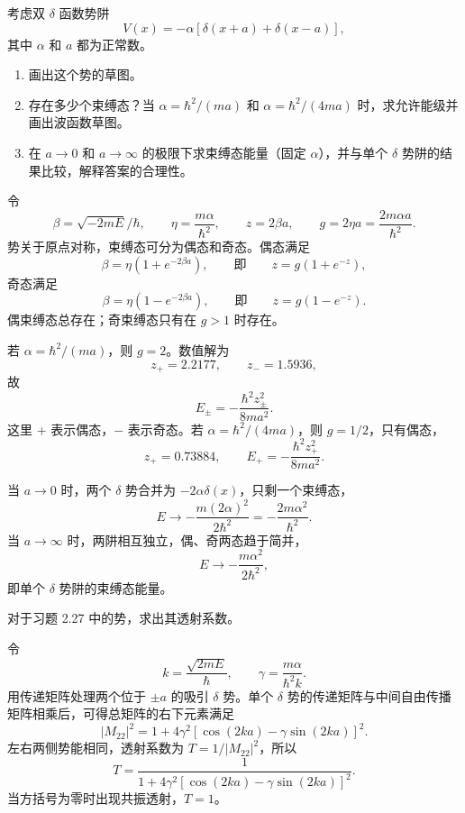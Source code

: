 \begin{question}
考虑双 $\delta$ 函数势阱
\[
V(x)=-\alpha[\delta(x+a)+\delta(x-a)],
\]
其中 $\alpha$ 和 $a$ 都为正常数。
\begin{enumerate}
\item 画出这个势的草图。
\item 存在多少个束缚态？当 $\alpha=\hbar^2/(ma)$ 和 $\alpha=\hbar^2/(4ma)$ 时，求允许能级并画出波函数草图。
\item 在 $a\to0$ 和 $a\to\infty$ 的极限下求束缚态能量（固定 $\alpha$），并与单个 $\delta$ 势阱的结果比较，解释答案的合理性。
\end{enumerate}
\end{question}
\begin{solution}
令
\[
\beta=\sqrt{-2mE}/\hbar,
\qquad
\eta=\frac{m\alpha}{\hbar^2},
\qquad
z=2\beta a,
\qquad
g=2\eta a=\frac{2m\alpha a}{\hbar^2}.
\]
势关于原点对称，束缚态可分为偶态和奇态。偶态满足
\[
\beta=\eta\left(1+e^{-2\beta a}\right),
\qquad\text{即}\qquad z=g(1+e^{-z}),
\]
奇态满足
\[
\beta=\eta\left(1-e^{-2\beta a}\right),
\qquad\text{即}\qquad z=g(1-e^{-z}).
\]
偶束缚态总存在；奇束缚态只有在 $g>1$ 时存在。

若 $\alpha=\hbar^2/(ma)$，则 $g=2$。数值解为
\[
z_+=2.2177,
\qquad z_-=1.5936,
\]
故
\[
E_\pm=-\frac{\hbar^2z_\pm^2}{8ma^2}.
\]
这里 $+$ 表示偶态，$-$ 表示奇态。若 $\alpha=\hbar^2/(4ma)$，则 $g=1/2$，只有偶态，
\[
z_+=0.73884,
\qquad
E_+=-\frac{\hbar^2z_+^2}{8ma^2}.
\]

当 $a\to0$ 时，两个 $\delta$ 势合并为 $-2\alpha\delta(x)$，只剩一个束缚态，
\[
E\to-\frac{m(2\alpha)^2}{2\hbar^2}=-\frac{2m\alpha^2}{\hbar^2}.
\]
当 $a\to\infty$ 时，两阱相互独立，偶、奇两态趋于简并，
\[
E\to-\frac{m\alpha^2}{2\hbar^2},
\]
即单个 $\delta$ 势阱的束缚态能量。
\end{solution}

\begin{question}
对于习题 2.27 中的势，求出其透射系数。
\end{question}
\begin{solution}
令
\[
k=\frac{\sqrt{2mE}}{\hbar},
\qquad
\gamma=\frac{m\alpha}{\hbar^2k}.
\]
用传递矩阵处理两个位于 $\pm a$ 的吸引 $\delta$ 势。单个 $\delta$ 势的传递矩阵与中间自由传播矩阵相乘后，可得总矩阵的右下元素满足
\[
|M_{22}|^2=1+4\gamma^2\left[\cos(2ka)-\gamma\sin(2ka)\right]^2.
\]
左右两侧势能相同，透射系数为 $T=1/|M_{22}|^2$，所以
\[
T=\frac{1}{1+4\gamma^2\left[\cos(2ka)-\gamma\sin(2ka)\right]^2}.
\]
当方括号为零时出现共振透射，$T=1$。
\end{solution}

